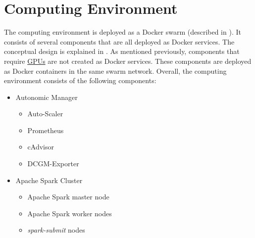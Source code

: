 \section{Computing Environment}
\label{sec:06_env}
The computing environment is deployed as a Docker swarm (described in ). It consists of several components that are all deployed as Docker services. The conceptual design is explained in .
As mentioned previously, components that require \hyperlink{abbr:gpu}{GPUs} are not created as Docker services. These components are deployed as Docker containers in the same swarm network.
Overall, the computing environment consists of the following components:
\begin{itemize}
\item Autonomic Manager
\begin{itemize}
\item Auto-Scaler
\item Prometheus
\item cAdvisor
\item DCGM-Exporter
\end{itemize}

\item Apache Spark Cluster
\begin{itemize}
\item Apache Spark master node
\item Apache Spark worker nodes
\item \textit{spark-submit} nodes
\end{itemize}
\end{itemize}


